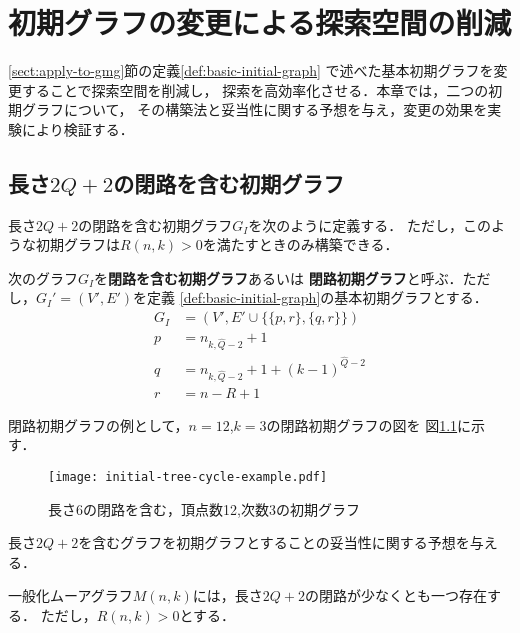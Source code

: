 
\chapter{初期グラフの変更による探索空間の削減}
\label{chap:reduce-by-initial-graph}
\ref{sect:apply-to-gmg}節の定義\ref{def:basic-initial-graph}
で述べた基本初期グラフを変更することで探索空間を削減し，
探索を高効率化させる．本章では，二つの初期グラフについて，
その構築法と妥当性に関する予想を与え，変更の効果を実験により検証する．

\section{長さ$2Q+2$の閉路を含む初期グラフ}
\label{sect:initial-graph-cycle}
長さ$2Q+2$の閉路を含む初期グラフ$G_I$を次のように定義する．
ただし，このような初期グラフは$R(n,k)>0$を満たすときのみ構築できる．
\begin{definition}[長さ$2Q+2$の閉路を含む初期グラフ]
  \label{def:cycle-initial-graph}
  次のグラフ$G_I$を\textbf{閉路を含む初期グラフ}あるいは
  \textbf{閉路初期グラフ}と呼ぶ．ただし，$G_I'=(V',E')$を定義
  \ref{def:basic-initial-graph}の基本初期グラフとする．
  \begin{equation}
    \begin{aligned}
      G_I&=(V',E'\cup\{\{p,r\},\{q,r\}\}) \\
      p&=n_{k,\hat{Q}-2}+1 \\
      q&=n_{k,\hat{Q}-2}+1+(k-1)^{\hat{Q}-2} \\
      r&=n-R+1
    \end{aligned}
  \end{equation}
\end{definition}
閉路初期グラフの例として，$n=12$,$k=3$の閉路初期グラフの図を
図\ref{fig:initial-graph-cycle-example}に示す．

\begin{figure}
  \centering
  \texttt{[image: initial-tree-cycle-example.pdf]}
  \caption{長さ6の閉路を含む，頂点数12,次数3の初期グラフ}
  \label{fig:initial-graph-cycle-example}
\end{figure}

長さ$2Q+2$を含むグラフを初期グラフとすることの妥当性に関する予想を与える．
\begin{conjecture}
  一般化ムーアグラフ$M(n,k)$には，長さ$2Q+2$の閉路が少なくとも一つ存在する．
  ただし，$R(n,k)>0$とする．
\end{conjecture}

